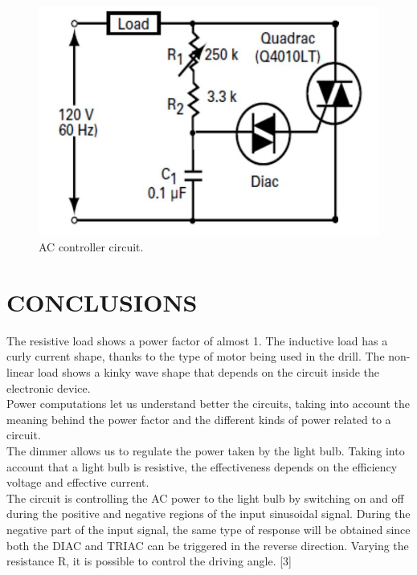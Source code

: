 \documentclass[journal]{IEEEtran}
\begin{document}
\begin{figure}[h]
\centering
\includegraphics[clip,width=\columnwidth]{controller.png}
\caption{AC controller circuit.}
\label{ACcontroller}
\end{figure}

\section{CONCLUSIONS}

The resistive load shows a power factor of almost 1. 
The inductive load has a curly current shape, thanks to 
the type of motor being used in the drill. The 
non-linear load shows a kinky wave shape that 
depends on the circuit inside the electronic device.\\

Power computations let us understand better the 
circuits, taking into account the meaning behind the 
power factor and the different kinds of 
power related to a circuit.\\

The dimmer allows us to regulate the power taken by the 
light bulb. Taking into account that a light bulb is 
resistive, the effectiveness depends on the efficiency 
voltage and effective current. \\

The circuit is controlling the AC power to the light bulb 
by switching on and off during the positive and negative 
regions of the input sinusoidal signal. During the 
negative part of the input signal, the same type of 
response will be obtained since both the DIAC and TRIAC 
can be triggered in the reverse direction. Varying the 
resistance R, it is possible to control the driving 
angle. [3]\\
\end{document}
